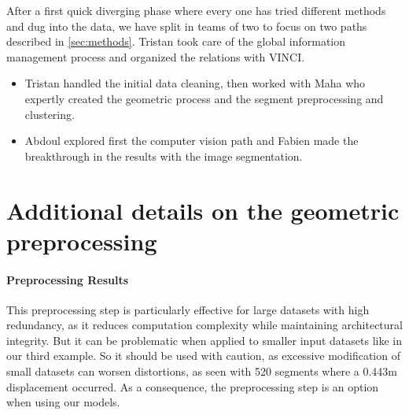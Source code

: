 \documentclass[11pt]{article}
\begin{document}
After a first quick diverging phase where every one has 
tried different methods and dug into the data,  we have split in teams of two 
to focus on two paths described in \cref{sec:methods}. Tristan took care of the global information management process and organized the
relations with VINCI.
\begin{itemize}
    \item Tristan handled the initial data cleaning, then worked with Maha who 
    expertly created the geometric process and the segment preprocessing and clustering.
    \item Abdoul explored first the computer vision path and Fabien made the 
    breakthrough in the results with the image segmentation.
\end{itemize}




{\small

}

\appendix

\newpage

\section{Additional details on the geometric preprocessing}
\label{app:sec:geomdetails}
\paragraph{Preprocessing Results}

This preprocessing step is particularly effective for large datasets with high 
redundancy, as it reduces computation complexity while maintaining architectural 
integrity. But it can be problematic when applied to smaller input datasets like 
in our third example. So it should be used with caution, as excessive modification 
of small datasets can worsen distortions, as seen with 520 segments where a 0.443m 
displacement occurred. As a consequence, the preprocessing step is an option when
using our models.
\end{document}
